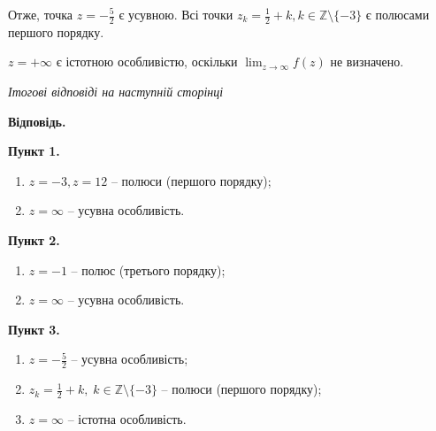 \documentclass[14pt]{extarticle}
\begin{document}
Отже, точка $z=-\frac{5}{2}$ є усувною. Всі точки $z_k = \frac{1}{2}+k, k \in \mathbb{Z} \setminus \{-3\}$ є полюсами першого порядку. 

$z = +\infty$ є істотною особливістю, оскільки $\lim_{z \to \infty} f(z)$ не визначено. 

\vspace{10px}
\begin{center}
\textit{Ітогові відповіді на наступній сторінці}
\end{center}

\pagebreak
\textbf{Відповідь.}

\textbf{Пункт 1.} 
\begin{enumerate}
\item $z=-3,z=12$ -- полюси (першого порядку);
\item $z=\infty$ -- усувна особливість.
\end{enumerate}

\textbf{Пункт 2.} 
\begin{enumerate}
\item $z=-1$ -- полюс (третього порядку);
\item $z=\infty$ -- усувна особливість.
\end{enumerate}

\textbf{Пункт 3.} 
\begin{enumerate}
\item $z=-\frac{5}{2}$ -- усувна особливість;
\item $z_k=\frac{1}{2}+k, \; k \in \mathbb{Z} \setminus \{-3\}$ -- полюси (першого порядку);
\item $z=\infty$ -- істотна особливість.
\end{enumerate}
\end{document}
